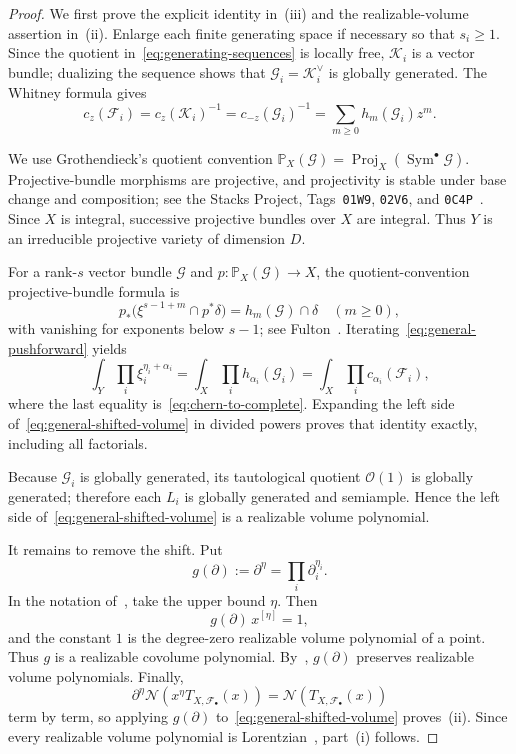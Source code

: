 \documentclass[11pt,a4paper,oneside]{amsart}
\numberwithin{equation}{section}
\theoremstyle{definition}
\theoremstyle{remark}
\newcommand{\cN}{\mathcal N}
\newcommand{\cO}{\mathcal O}
\newcommand{\cF}{\mathcal F}
\newcommand{\cG}{\mathcal G}
\newcommand{\cK}{\mathcal K}
\begin{document}
\begin{proof}
We first prove the explicit identity in~\textup{(iii)} and the realizable-volume assertion in~\textup{(ii)}.  Enlarge each finite generating space if necessary so that $s_i\geq1$.  Since the quotient in~\eqref{eq:generating-sequences} is locally free, $\cK_i$ is a vector bundle; dualizing the sequence shows that $\cG_i=\cK_i^\vee$ is globally generated.  The Whitney formula gives
\begin{equation}\label{eq:chern-to-complete}
 c_z(\cF_i)=c_z(\cK_i)^{-1}=c_{-z}(\cG_i)^{-1}
 =\sum_{m\geq0}h_m(\cG_i)z^m.
\end{equation}

We use Grothendieck's quotient convention
$\mathbb P_X(\cG)=\operatorname{Proj}_X(\operatorname{Sym}^\bullet\cG)$.
Projective-bundle morphisms are projective, and projectivity is stable under base change and composition; see the Stacks Project, Tags~\texttt{01W9}, \texttt{02V6}, and \texttt{0C4P}~\cite{Stacks}.  Since $X$ is integral, successive projective bundles over $X$ are integral.  Thus $Y$ is an irreducible projective variety of dimension $D$.

For a rank-$s$ vector bundle $\cG$ and $p:\mathbb P_X(\cG)\to X$, the quotient-convention projective-bundle formula is
\begin{equation}\label{eq:general-pushforward}
 p_*\bigl(\xi^{s-1+m}\cap p^*\delta\bigr)
 =h_m(\cG)\cap\delta\quad(m\geq0),
\end{equation}
with vanishing for exponents below $s-1$; see Fulton~\cite[Theorem~3.3]{FultonIT}.  Iterating~\eqref{eq:general-pushforward} yields
\[
 \int_Y\prod_i\xi_i^{\eta_i+\alpha_i}
 =\int_X\prod_i h_{\alpha_i}(\cG_i)
 =\int_X\prod_i c_{\alpha_i}(\cF_i),
\]
where the last equality is~\eqref{eq:chern-to-complete}.  Expanding the left side of~\eqref{eq:general-shifted-volume} in divided powers proves that identity exactly, including all factorials.

Because $\cG_i$ is globally generated, its tautological quotient $\cO(1)$ is globally generated; therefore each $L_i$ is globally generated and semiample.  Hence the left side of~\eqref{eq:general-shifted-volume} is a realizable volume polynomial.

It remains to remove the shift.  Put
\[
 g(\partial):=\partial^\eta=\prod_i\partial_i^{\eta_i}.
\]
In the notation of~\cite[Definition~1.2]{GHMSW25}, take the upper bound $\eta$.  Then
\[
 g(\partial)\,x^{[\eta]}=1,
\]
and the constant $1$ is the degree-zero realizable volume polynomial of a point.  Thus $g$ is a realizable covolume polynomial.  By~\cite[Theorem~1.3]{GHMSW25}, $g(\partial)$ preserves realizable volume polynomials.  Finally,
\[
 \partial^\eta\cN\!\left(x^\eta T_{X,\cF_\bullet}(x)\right)
 =\cN\!\left(T_{X,\cF_\bullet}(x)\right)
\]
term by term, so applying $g(\partial)$ to~\eqref{eq:general-shifted-volume} proves~\textup{(ii)}.  Since every realizable volume polynomial is Lorentzian~\cite[Theorem~4.6]{BH20}, part~\textup{(i)} follows.


\end{proof}
\end{document}

